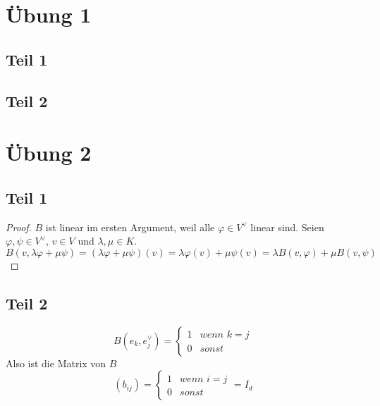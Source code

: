 \documentclass[10pt,a4paper]{article}
\begin{document}
\section*{Übung 1}

\subsection*{Teil 1}

\subsection*{Teil 2}

\section*{Übung 2}

\subsection*{Teil 1}

\begin{proof}
$B$ ist linear im ersten Argument, weil alle $\varphi \in V^{\vee}$ linear sind.
Seien $\varphi, \psi \in V^{\vee}$, $v \in V$ und $\lambda, \mu \in K$.
\begin{equation}
B(v, \lambda \varphi + \mu \psi) = (\lambda \varphi + \mu \psi)(v) = \lambda \varphi(v) + \mu \psi(v) = \lambda B(v, \varphi) + \mu B(v, \psi)
\end{equation}
\end{proof}

\subsection*{Teil 2}

\begin{equation}
B(e_{k}, e_{j}^{\vee}) = \begin{cases}
1 & \textit{wenn $k = j$}\\
0 & \textit{sonst}
\end{cases}
\end{equation}
Also ist die Matrix von $B$
\begin{equation}
(b_{ij}) = \begin{cases}
1 & \textit{wenn $i = j$}\\
0 & \textit{sonst}
\end{cases}
= I_{d}
\end{equation}
\end{document}
